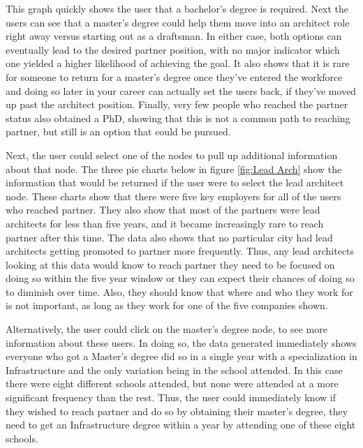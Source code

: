 This graph quickly shows the user that a bachelor's degree is required.  Next
the users can see that a master's degree could help them move into an architect
role right away versus starting out as a draftsman.  In either case, both
options can eventually lead to the desired partner position, with no major
indicator which one yielded a higher likelihood of achieving the goal.  It also
shows that it is rare for someone to return for a master's degree once they've
entered the workforce and doing so later in your career can actually set the
users back, if they've moved up past the architect position.  Finally, very
few people who reached the partner status also obtained a PhD, showing that this
is not a common path to reaching partner, but still is an option that could be
pursued.

Next, the user could select one of the nodes to pull up additional information
about that node.  The three pie charts below in figure \ref{fig:Lead Arch} show
the information that would be returned if the user were to select the lead
architect node.  These charts show that there were five key employers for all of
the users who reached partner.  They also show that most of the partners were
lead architects for less than five years, and it became increasingly rare to
reach partner after this time.  The data also shows that no particular city had
lead architects getting promoted to partner more frequently.  Thus, any lead
architects looking at this data would know to reach partner they need to be
focused on doing so within the five year window or they can expect their chances
of doing so to diminish over time.  Also, they should know that where and who
they work for is not important, as long as they work for one of the five
companies shown.

Alternatively, the user could click on the master's degree node, to see more
information about these users.  In doing so, the data generated immediately
shows everyone who got a Master's degree did so in a single year with a
specialization in Infrastructure and the only variation being in the school
attended.  In this case there were eight different schools attended, but none
were attended at a more significant frequency than the rest.  Thus, the user
could immediately know if they wished to reach partner and do so by obtaining their
master's degree, they need to get an Infrastructure degree within a year by
attending one of these eight schools.


